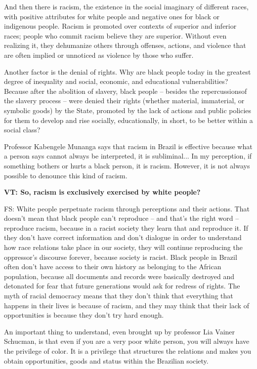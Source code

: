 \documentclass[a4paper,
fontsize=11pt,
oneside,
numbers=noperiodatend,
parskip=half-,
bibliography=totoc,
final
]{scrartcl}
\begin{document}
And then there is racism, the existence in the social imaginary of
different races, with positive attributes for white people and negative
ones for black or indigenous people. Racism is promoted over contexts of
superior and inferior races; people who commit racism believe they are
superior. Without even realizing it, they dehumanize others through
offenses, actions, and violence that are often implied or unnoticed as
violence by those who suffer.

Another factor is the denial of rights. Why are black people today in
the greatest degree of inequality and social, economic, and educational
vulnerabilities? Because after the abolition of slavery, black people --
besides the repercussionsof the slavery process -- were denied their
rights (whether material, immaterial, or symbolic goods) by the State,
promoted by the lack of actions and public policies for them to develop
and rise socially, educationally, in short, to be better within a social
class?

Professor Kabengele Munanga says that racism in Brazil is effective
because what a person says cannot always be interpreted, it is
subliminal... In my perception, if something bothers or hurts a black
person, it is racism. However, it is not always possible to denounce
this kind of racism.

\textbf{VT: So, racism is exclusively exercised by white people?}

FS: White people perpetuate racism through perceptions and their
actions. That doesn't mean that black people can't reproduce -- and
that's the right word -- reproduce racism, because in a racist society
they learn that and reproduce it. If they don't have correct information
and don't dialogue in order to understand how race relations take place
in our society, they will continue reproducing the oppressor's discourse
forever, because society is racist. Black people in Brazil often don't
have access to their own history as belonging to the African population,
because all documents and records were basically destroyed and detonated
for fear that future generations would ask for redress of rights. The
myth of racial democracy means that they don't think that everything
that happens in their lives is because of racism, and they may think
that their lack of opportunities is because they don't try hard enough.

An important thing to understand, even brought up by professor Lia
Vainer Schucman, is that even if you are a very poor white person, you
will always have the privilege of color. It is a privilege that
structures the relations and makes you obtain opportunities, goods and
status within the Brazilian society.
\end{document}
